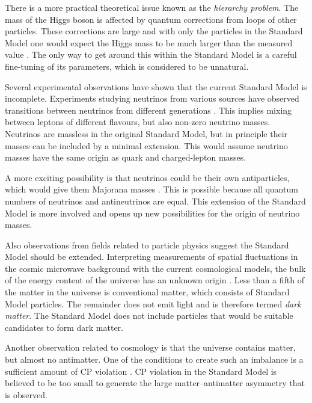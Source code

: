 There is a more practical theoretical issue known as the \emph{hierarchy problem}. The mass of the Higgs boson is affected by quantum
corrections from loops of other particles. These corrections are large and with only the particles in the Standard Model one would expect
the Higgs mass to be much larger than the measured value \cite{Weinberg:1975gm,*Susskind:1978ms,*'tHooft:1979bj}. The only way to get
around this within the Standard Model is a careful fine-tuning of its parameters, which is considered to be unnatural.

Several experimental observations have shown that the current Standard Model is incomplete. Experiments studying neutrinos from various
sources have observed transitions between neutrinos from different generations
\cite{Fukuda:1998mi,*Ahmad:2002jz,*Eguchi:2002dm,*An:2012eh}. This implies mixing between leptons of different flavours, but also non-zero
neutrino masses. Neutrinos are massless in the original Standard Model, but in principle their masses can be included by a minimal
extension. This would assume neutrino masses have the same origin as quark and charged-lepton masses.

A more exciting possibility is that neutrinos could be their own antiparticles, which would give them Majorana masses
\cite{Majorana:1937vz}. This is possible because all quantum numbers of neutrinos and antineutrinos are equal. This extension of the
Standard Model is more involved and opens up new possibilities for the origin of neutrino masses.

Also observations from fields related to particle physics suggest the Standard Model should be extended. Interpreting measurements of
spatial fluctuations in the cosmic microwave background with the current cosmological models, the bulk of the energy content of the
universe has an unknown origin \cite{Hinshaw:2012aka}. Less than a fifth of the matter in the universe is conventional matter, which
consists of Standard Model particles. The remainder does not emit light and is therefore termed \emph{dark matter}. The Standard Model does
not include particles that would be suitable candidates to form dark matter.

Another observation related to cosmology is that the universe contains matter, but almost no antimatter. One of the conditions to create
such an imbalance is a sufficient amount of CP violation \cite{Sakharov:1967dj}. CP violation in the Standard Model is believed to be too
small to generate the large matter--antimatter asymmetry that is observed.

